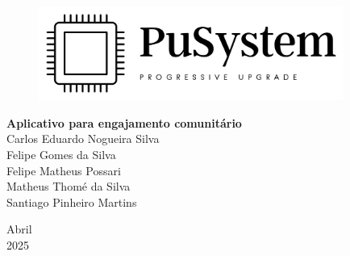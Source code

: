 \documentclass[a5paper, 12pt]{article}
\begin{document}

\begin{titlepage}
	\begin{center}
	
	\begin{figure}[!ht]
	\centering
	\includegraphics[width=10cm]{Logo Transparente Preto.png} \\ 
    \end{figure}

        
		\vspace{115pt}
        \textbf{\Huge{Aplicativo para engajamento comunitário}}\\
        
		\vspace{115pt}
        Carlos Eduardo Nogueira Silva \\
        Felipe Gomes da Silva \\
        Felipe Matheus Possari \\
        Matheus Thomé da Silva\\ 
        Santiago Pinheiro Martins \\
	\end{center}
	
	
	\vspace{1cm}
	\begin{center}
		\vspace{\fill}
		 Abril \\
		 2025
			\end{center}
\end{titlepage}




\newpage
\thispagestyle{empty}
\tableofcontents

\newpage 
\thispagestyle{empty}
\listoffigures

\newpage
\thispagestyle{empty}
\listoftables

\newpage
\pagestyle{fancy}

\fancyhead[L]{\thepage}
\fancyhead[C]{\nouppercase{\leftmark}}
\fancyfoot[R]{}
\fancyfoot[L]{}
\setlength\headheight{26pt}
\end{document}
